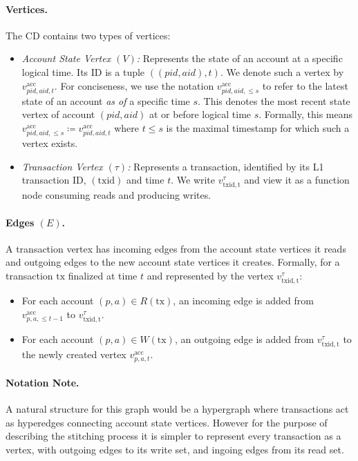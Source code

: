\documentclass[onecolumn, 9pt, a4paper]{extarticle}
\begin{document}
\paragraph{Vertices.} The CD contains two types of vertices:
\begin{itemize}[nosep]
  \item \emph{Account State Vertex $(V)$:} Represents the state of an account at a specific logical time. Its ID is a tuple $((pid,aid),t)$. We denote such a vertex by $v^{\mathrm{acc}}_{pid,aid,t}$. For conciseness, we use the notation $v^{\mathrm{acc}}_{pid,aid,\leq s}$ to refer to the latest state of an account \textit{as of} a specific time $s$. This denotes the most recent state vertex of account $(pid,aid)$ at or before logical time $s$. Formally, this means $v^{\mathrm{acc}}_{pid,aid,\leq s} \coloneqq v^{\mathrm{acc}}_{pid,aid,t}$ where $t \le s$ is the maximal timestamp for which such a vertex exists.
  \item \emph{Transaction Vertex $(\tau)$:} Represents a transaction, identified by its L1 transaction ID, $(\mathrm{txid})$ and time $t$. We write $v^{\tau}_{\mathrm{txid,t}}$ and view it as a function node consuming reads and producing writes.
\end{itemize}


\paragraph{Edges $(E)$.} A transaction vertex has incoming edges from the account state vertices it reads and outgoing edges to the new account state vertices it creates. Formally, for a transaction $\mathrm{tx}$ finalized at time $t$ and represented by the vertex $v^{\tau}_{\mathrm{txid,t}}$:
\begin{itemize}[nosep]
    \item For each account $(p,a) \in R(\mathrm{tx})$, an incoming edge is added from $v^{\mathrm{acc}}_{p,a,\leq t-1}$ to $v^{\tau}_{\mathrm{txid,t}}$.
    \item For each account $(p,a) \in W(\mathrm{tx})$, an outgoing edge is added from $v^{\tau}_{\mathrm{txid,t}}$ to the newly created vertex $v^{\mathrm{acc}}_{p,a,t}$.
\end{itemize}



\paragraph{Notation Note.} A natural structure for this graph would be a hypergraph where transactions act as hyperedges
connecting account state vertices. However for the purpose of describing the stitching process it
is simpler to represent every transaction as a vertex, with outgoing edges to its write set, and ingoing
edges from its read set. 
\end{document}
